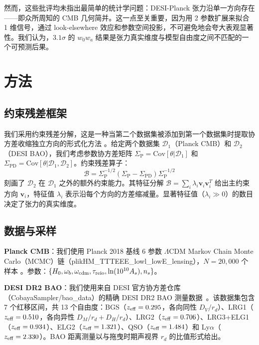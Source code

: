 \documentclass[12pt]{ctexart}
\newcommand{\szero}[0]{\Sigma_{\mathrm{P}}}
\newcommand{\sone}[0]{\Sigma_{\mathrm{PD}}}
\begin{document}
然而，这些批评均未指出最简单的统计学问题：DESI-Planck 张力沿单一方向存在——即众所周知的 CMB 几何简并。这一点至关重要，因为用 2 参数扩展来拟合 1 维信号，通过 look-elsewhere 效应和参数空间投影，不可避免地会夸大表观显著性。我们认为，$3.1\sigma$ 的 $w_0 w_a$ 结果是张力真实维度与模型自由度之间不匹配的一个可预测后果。

\section{方法}
\label{sec:method}

\subsection{约束残差框架}

我们采用约束残差分解，这是一种当第二个数据集被添加到第一个数据集时提取协方差收缩独立方向的形式化方法 \citep{sam2026}。给定两个数据集 $\mathcal{D}_1$（Planck CMB）和 $\mathcal{D}_2$（DESI BAO），我们考虑参数协方差矩阵 $\szero = \mathrm{Cov}[\theta | \mathcal{D}_1]$ 和 $\sone = \mathrm{Cov}[\theta | \mathcal{D}_1, \mathcal{D}_2]$。约束残差算子：
\begin{equation}
\mathcal{B} = \szero^{-1/2} \left(\szero - \sone\right) \szero^{-1/2}
\label{eq:bop}
\end{equation}
刻画了 $\mathcal{D}_2$ 在 $\mathcal{D}_1$ 之外的额外约束能力。其特征分解 $\mathcal{B} = \sum_i \lambda_i \mathbf{v}_i \mathbf{v}_i^T$ 给出主约束方向 $\mathbf{v}_i$，特征值 $\lambda_i$ 表示沿每个方向的方差缩减量。显著特征值（$\lambda_i \gg 0$）的数目决定了张力的真实维度。

\subsection{数据与采样}

\textbf{Planck CMB}：我们使用 Planck 2018 基线 6 参数 $\Lambda$CDM Markov Chain Monte Carlo（MCMC）链（plikHM\_TTTEEE\_lowl\_lowE\_lensing），$N = 20,000$ 个样本 \citep{planck2020}。参数：$\{H_0, \omega_b, \omega_{\rm cdm}, \tau_{\rm reio}, \ln(10^{10} A_s), n_s\}$。

\textbf{DESI DR2 BAO}：我们使用来自 DESI 官方协方差仓库（CobayaSampler/bao\_data）的精确 DESI DR2 BAO 测量数据~\citep{desi2025dr2}。该数据集包含 7 个红移区间，共 13 个自由度：BGS（$z_{\rm eff}=0.295$，各向同性 $D_V/r_d$）、LRG1（$z_{\rm eff}=0.510$，各向异性 $D_M/r_d + D_H/r_d$）、LRG2（$z_{\rm eff}=0.706$）、LRG3+ELG1（$z_{\rm eff}=0.934$）、ELG2（$z_{\rm eff}=1.321$）、QSO（$z_{\rm eff}=1.484$）和 Ly$\alpha$（$z_{\rm eff}=2.330$）。BAO 距离测量以与拖曳时期声视界 $r_d$ 的比值形式给出。
\end{document}
